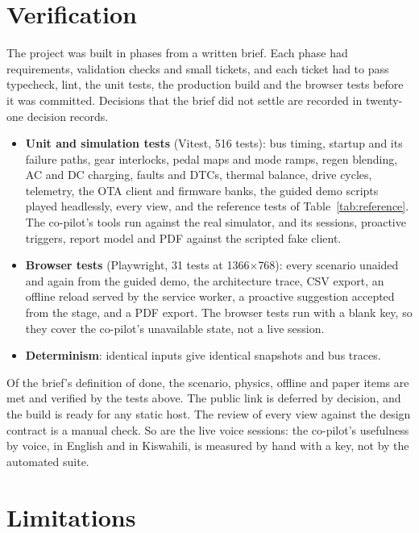 \documentclass[10pt]{article}
\begin{document}
\section{Verification}

The project was built in phases from a written brief. Each phase had requirements, validation checks and small tickets, and each ticket had to pass typecheck, lint, the unit tests, the production build and the browser tests before it was committed. Decisions that the brief did not settle are recorded in twenty-one decision records.

\begin{itemize}
  \item \textbf{Unit and simulation tests} (Vitest, 516 tests): bus timing, startup and its failure paths, gear interlocks, pedal maps and mode ramps, regen blending, AC and DC charging, faults and DTCs, thermal balance, drive cycles, telemetry, the OTA client and firmware banks, the guided demo scripts played headlessly, every view, and the reference tests of Table~\ref{tab:reference}. The co-pilot's tools run against the real simulator, and its sessions, proactive triggers, report model and PDF against the scripted fake client.
  \item \textbf{Browser tests} (Playwright, 31 tests at 1366$\times$768): every scenario unaided and again from the guided demo, the architecture trace, CSV export, an offline reload served by the service worker, a proactive suggestion accepted from the stage, and a PDF export. The browser tests run with a blank key, so they cover the co-pilot's unavailable state, not a live session.
  \item \textbf{Determinism}: identical inputs give identical snapshots and bus traces.
\end{itemize}

Of the brief's definition of done, the scenario, physics, offline and paper items are met and verified by the tests above. The public link is deferred by decision, and the build is ready for any static host. The review of every view against the design contract is a manual check. So are the live voice sessions: the co-pilot's usefulness by voice, in English and in Kiswahili, is measured by hand with a key, not by the automated suite.

\section{Limitations}
\end{document}
